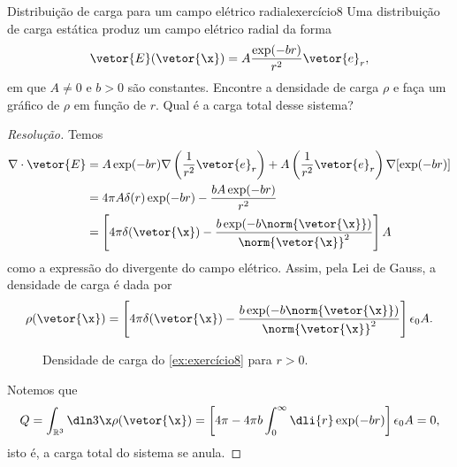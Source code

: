 \begin{exercício}{Distribuição de carga para um campo elétrico radial}{exercício8}
    Uma distribuição de carga estática produz um campo elétrico radial da forma
    \begin{equation*}
        \vetor{E}(\vetor{\x}) = A\frac{\exp(-br)}{r^2}\vetor{e}_r,
    \end{equation*}
    em que \(A \neq 0\) e \(b > 0\) são constantes. Encontre a densidade de carga \(\rho\) e faça um gráfico de \(\rho\) em função de \(r\). Qual é a carga total desse sistema?
\end{exercício}
\begin{proof}[Resolução]
    Temos
    \begin{align*}
        \nabla \cdot \vetor{E} &= A \exp(-br)\nabla\left(\frac1{r^2}\vetor{e}_r\right) + A \left(\frac{1}{r^2}\vetor{e}_r\right)\nabla[\exp(-br)]\\
        &= 4\pi A \delta(r) \exp(-br) - \frac{bA\exp(-br)}{r^2}\\
        &= \left[4\pi \delta(\vetor{\x}) - \frac{b \exp(-b\norm{\vetor{\x}})}{\norm{\vetor{\x}}^2}\right]A
    \end{align*}
    como a expressão do divergente do campo elétrico. Assim, pela Lei de Gauss, a densidade de carga é dada por
    \begin{equation*}
        \rho(\vetor{\x}) = \left[4\pi \delta(\vetor{\x}) - \frac{b \exp(-b\norm{\vetor{\x}})}{\norm{\vetor{\x}}^2}\right]\epsilon_0 A.
    \end{equation*}

    \begin{figure}[!ht]
        \centering
        \caption{Densidade de carga do \cref{ex:exercício8} para \(r > 0\).}
    \end{figure}

    Notemos que
    \begin{align*}
        Q = \int_{\mathbb{R}^3} \dln3\x \rho(\vetor{\x}) = \left[4\pi - 4\pi b \int_{0}^\infty \dli{r} \exp(-br)\right]\epsilon_0 A = 0,
    \end{align*}
    isto é, a carga total do sistema se anula.
\end{proof}
